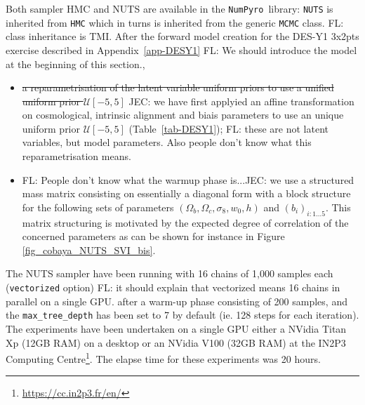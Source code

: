 \documentclass[twocolumn,twocolappendix,nofootinbib,iop]{openjournal}
\newcommand{\FrL}[1]{{\color{cyan}FL: #1}}
\newcommand{\JEC}[1]{{\color{magenta}JEC: #1}}
\newcommand{\numpyro}{\texttt{NumPyro}}
\begin{document}
Both sampler HMC and NUTS are available in the \numpyro\ library: \texttt{NUTS} is inherited from \texttt{HMC} which in turns is inherited from the generic \texttt{MCMC} class. \FrL{class inheritance is TMI.}  After the forward model creation for the DES-Y1 3x2pts exercise described in Appendix~\ref{app-DESY1} \FrL{We should introduce the model at the beginning of this section.},
\begin{itemize}
    \item \st{a reparametrisation of the latent variable uniform priors to use a unified uniform prior $\mathcal{U}[-5,5]$} \JEC{we have first applyied  an affine transformation on cosmological, intrinsic alignment and biais parameters to use an unique uniform prior $\mathcal{U}[-5,5]$ (Table~\ref{tab-DESY1})}; \FrL{these are not latent variables, but model parameters. Also people don't know what this reparametrisation means.}
    \item  \FrL{People don't know what the warmup phase is...}\JEC{we use a structured mass matrix consisting on essentially a diagonal form  with a block structure for the following sets of parameters} $(\Omega_b,\Omega_c,\sigma_8,w_0,h)$ and $(b_i)_{i:1\dots5}$. This matrix structuring is motivated by the expected degree of correlation of the concerned parameters as can be shown for instance in Figure \ref{fig_cobaya_NUTS_SVI_bis}.
\end{itemize}
The NUTS sampler have been running with 16 chains of 1,000 samples each (\texttt{vectorized} option) \FrL{it should explain that vectorized means 16 chains in parallel on a single GPU.} after a warm-up phase consisting of 200 samples, and the \texttt{max\_tree\_depth} has been set to 7 by default (ie. 128 steps for each iteration). The experiments have been undertaken on a single GPU either a NVidia Titan Xp (12GB RAM) on a desktop or an NVidia V100 (32GB RAM) at the IN2P3 Computing Centre\footnote{\url{https://cc.in2p3.fr/en/}}. The elapse time for these experiments was 20 hours.
\end{document}
